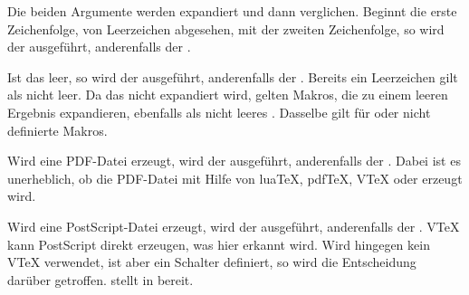 \begin{Declaration}
\end{Declaration}
Die
beiden Argumente  werden expandiert und dann
verglichen. Beginnt die erste Zeichenfolge, von Leerzeichen abgesehen, mit der
zweiten Zeichenfolge, so wird der  ausgeführt, anderenfalls
der .%
\iffalse%
\iftrue%
\ Von dieser Anweisung gibt es keine interne Variante.%
\else%
\ Es gibt keine interne Variante.%
\fi%
\fi%
\EndIndexGroup


\begin{Declaration}
\end{Declaration}
Ist das  leer, so wird der
 ausgeführt, anderenfalls der . Bereits ein
Leerzeichen gilt als nicht leer. Da das  nicht expandiert
wird, gelten Makros, die zu einem leeren Ergebnis expandieren, ebenfalls als
nicht leeres . Dasselbe gilt für  oder nicht
definierte Makros.%
\EndIndexGroup


\begin{Declaration}
\end{Declaration}
Wird eine PDF-Datei erzeugt, wird der
 ausgeführt, anderenfalls der . Dabei ist
es unerheblich, ob die PDF-Datei mit Hilfe von lua\TeX{}, pdf\TeX{}, V\TeX{}
oder \XeTeX{} erzeugt wird.%
\EndIndexGroup


\begin{Declaration}
\end{Declaration}
Wird eine PostScript-Datei erzeugt, wird
der  ausgeführt, anderenfalls der . V\TeX{}
kann PostScript direkt erzeugen, was hier erkannt wird. Wird hingegen kein
V\TeX{} verwendet, ist aber ein Schalter  definiert, so wird
die Entscheidung darüber getroffen. \KOMAScript{} stellt  in
\hyperref[cha:typearea]{}%
 bereit.%
\EndIndexGroup


